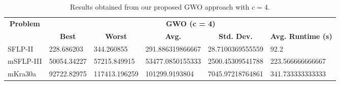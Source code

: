 \begin{table}[h!]
\begin{adjustwidth}{-1.18in}{}
	\centering
	\begin{tabular}{|l|l|l|l|l|l|}
	\hline
	\multicolumn{1}{|c|}{\multirow{2}{*}{\textbf{Problem}}} & \multicolumn{5}{c|}{\textbf{GWO (c = 4)}} \\ \cline{2-6} 
	\multicolumn{1}{|c|}{}                                  & \multicolumn{1}{c|}{\textbf{Best}} & \multicolumn{1}{c|}{\textbf{Worst}} & \multicolumn{1}{c|}{\textbf{Avg.}} & \multicolumn{1}{c|}{\textbf{Std. Dev.}} & \multicolumn{1}{c|}{\textbf{Avg. Runtime (s)}} \\ \hline
	SFLP-II                                                 & 228.686203                                  & 344.260855                                   & 291.886319866667                      & 28.7100369555559                                 & 92.2                                  \\ \hline
	mSFLP-III                                               & 50054.34227                                & 57215.849915                                 & 53477.0850155333						         & 2500.45309541788                              & 223.566666666667                               \\ \hline
	mKra30a                                               & 92722.82975                                & 117413.196259                                 &
	101299.9193804							&
	7045.97218764861							&
	341.733333333333						\\ \hline
	\end{tabular}
\end{adjustwidth}
\caption{Results obtained from our proposed GWO approach with $c = 4$.}
\label{approach-gwo-c4-results}
\end{table}

